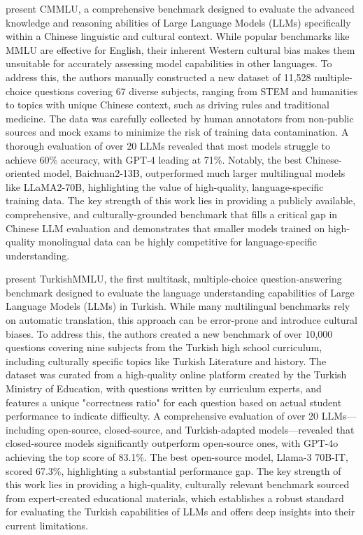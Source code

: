 \documentclass[acmsmall]{acmart}
\begin{document}
\citep{li2023cmmlu} present CMMLU, a comprehensive benchmark designed to evaluate the advanced knowledge and reasoning abilities of Large Language Models (LLMs) specifically within a Chinese linguistic and cultural context. While popular benchmarks like MMLU are effective for English, their inherent Western cultural bias makes them unsuitable for accurately assessing model capabilities in other languages. To address this, the authors manually constructed a new dataset of 11,528 multiple-choice questions covering 67 diverse subjects, ranging from STEM and humanities to topics with unique Chinese context, such as driving rules and traditional medicine. The data was carefully collected by human annotators from non-public sources and mock exams to minimize the risk of training data contamination. A thorough evaluation of over 20 LLMs revealed that most models struggle to achieve 60\% accuracy, with GPT-4 leading at 71\%. Notably, the best Chinese-oriented model, Baichuan2-13B, outperformed much larger multilingual models like LLaMA2-70B, highlighting the value of high-quality, language-specific training data. The key strength of this work lies in providing a publicly available, comprehensive, and culturally-grounded benchmark that fills a critical gap in Chinese LLM evaluation and demonstrates that smaller models trained on high-quality monolingual data can be highly competitive for language-specific understanding.

 \citep{yuksel2024turkishmmlu} present TurkishMMLU, the first multitask, multiple-choice question-answering benchmark designed to evaluate the language understanding capabilities of Large Language Models (LLMs) in Turkish. While many multilingual benchmarks rely on automatic translation, this approach can be error-prone and introduce cultural biases. To address this, the authors created a new benchmark of over 10,000 questions covering nine subjects from the Turkish high school curriculum, including culturally specific topics like Turkish Literature and history. The dataset was curated from a high-quality online platform created by the Turkish Ministry of Education, with questions written by curriculum experts, and features a unique "correctness ratio" for each question based on actual student performance to indicate difficulty. A comprehensive evaluation of over 20 LLMs—including open-source, closed-source, and Turkish-adapted models—revealed that closed-source models significantly outperform open-source ones, with GPT-4o achieving the top score of 83.1\%. The best open-source model, Llama-3 70B-IT, scored 67.3\%, highlighting a substantial performance gap. The key strength of this work lies in providing a high-quality, culturally relevant benchmark sourced from expert-created educational materials, which establishes a robust standard for evaluating the Turkish capabilities of LLMs and offers deep insights into their current limitations.
\end{document}
